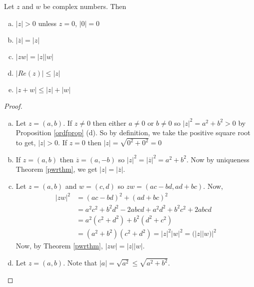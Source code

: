 \begin{thm}
    Let $z$ and $w$ be complex numbers. Then 
    \begin{enumerate}[a)]
        \item $|z| > 0$ unless $z = 0$, $|0| = 0$
        \item $|\overline{z}| = |z|$
        \item $|zw| = |z||w|$
        \item $|Re (z)| \leq |z|$
        \item $|z + w| \leq |z| + |w|$  
    \end{enumerate}
    \begin{proof}
        \begin{enumerate}[a)]
            \item Let $z = (a, b)$. If $z \neq 0$ then either $a \neq 0$ or $b \neq 0$ so $|z|^2 = a^2 + b^2 > 0$ by Proposition \ref{ordfprop} (d). 
            So by definition, we take the positive square root to get, $|z| > 0$.
            If $z = 0$ then $|z| = \sqrt{0^2 + 0^2} = 0$
            
            \item If $z = (a, b)$ then $\overline{z} = (a, -b)$ so $|z|^2 = |\overline{z}|^2 = a^2 + b^2$.
            Now by uniqueness Theorem \ref{pwrthm}, we get $|z| = |\overline{z}|$.
            
            \item Let $z = (a, b)$ and $w = (c, d)$ so $zw = (ac - bd, ad + bc)$.
            Now, 
            \begin{align*}
            |zw|^2 & = (ac - bd)^2 + (ad + bc)^2 \\
                & = a^2 c^2 + b^2 d^2 - 2abcd + a^2 d^2 + b^2 c^2 + 2abcd \\
                & = a^2(c^2 + d^2) + b^2(d^2 + c^2) \\
                & = (a^2 + b^2) (c^2 + d^2) = |z|^2 |w|^2 = (|z||w)|^2 
            \end{align*}
            Now, by Theorem \ref{pwrthm}, $|zw| = |z||w|$.

            \item Let $z = (a, b)$. Note that  $|a| = \sqrt{a^2} \leq \sqrt{a^2 + b^2}$.
            

\end{enumerate}
\end{proof}
\end{thm}
